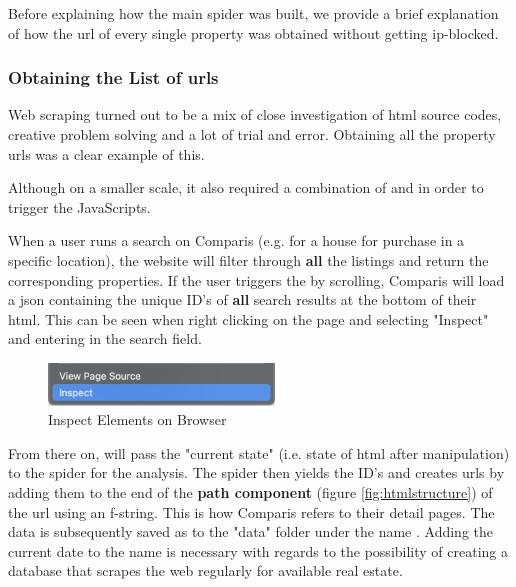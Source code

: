\documentclass[main]{subfiles}
\begin{document}
Before explaining how the main spider  was built,
we provide a brief explanation of how the \acs*{url} of every single property 
was obtained without getting \acs*{ip}-blocked.

\vspace*{5pt}
\subsubsection{Obtaining the List of \acsp*{url}}
\label{scrape1}
Web scraping turned out to be a mix of close investigation of \acs*{html} source codes, 
creative problem solving and a lot of trial and error. 
Obtaining all the property \acsp*{url} was a clear example of this.

Although on a smaller scale, 
it also required a combination of \pkg[Scrapy] and \pkg[Selenium] in order to trigger the JavaScripts.

When a user runs a search on Comparis (e.g. for a house for purchase in a specific location), 
the website will filter through \textbf{all} the listings and return the corresponding properties.
If the user triggers the \js by scrolling, Comparis will load a \acs*{json} 
containing the unique ID's of \textbf{all} search results at the bottom of their \acs*{html}.
This can be seen when right clicking on the page and selecting "Inspect" and entering  
in the search field.

\begin{figure}[htbp]
    \centerline{
        \includegraphics[width = 60mm]{prog_3.png}}
    \caption{Inspect Elements on Browser}
    \label{fig:inspectelement}
\end{figure}

From there on, \pkg[Selenium] will pass the "current state" (i.e. state of \acs*{html} after \js manipulation)
to the spider for the analysis.
The spider then yields the ID's and creates \acsp*{url} by adding them to the end of the \textbf{path component} 
(figure \ref{fig:htmlstructure}) of the \acs*{url}  using an f-string.
This is how Comparis refers to their detail pages.
The data is subsequently saved as \pkg[.csv] to the "data" folder under the name .
Adding the current date to the name is necessary with regards to the possibility 
of creating a database that scrapes the web regularly for available real estate.
\end{document}
